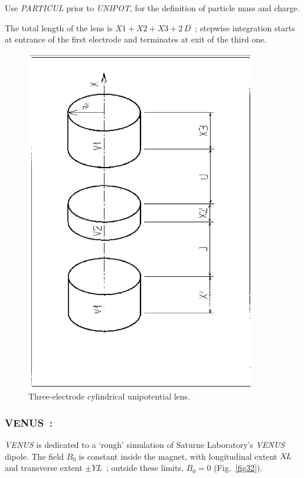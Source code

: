 \noindent Use \textsl{PARTICUL} prior to \textsl{UNIPOT}, for the
 definition of particle mass and charge.

\bigskip

\noindent The total length of the lens is $X1+X2+X3+2\,D$~; stepwise integration starts 
at entrance of the first electrode and terminates at exit of the third one. 

\vfill

\begin{figure}[H]
\centerline{\includegraphics[height=15cm,angle=-90]{Fig31.ps}}
\caption{\label{fig31}Three-electrode cylindrical unipotential lens.}
\end{figure}
\vfill

\newpage

\subsubsection*{VENUS~: \VENUSTitl}  \label{VENUS}

\textsl{VENUS} is dedicated to a `rough' simulation
of Saturne Laboratory's  \textsl{VENUS} 
dipole.  The field $ B_0 $ is constant inside the magnet, with longitudinal 
extent $ X\!L $ and transverse extent $ \pm YL $~;  outside these limits, $ B_0=0$ 
(Fig.~\ref{fig32}).  

